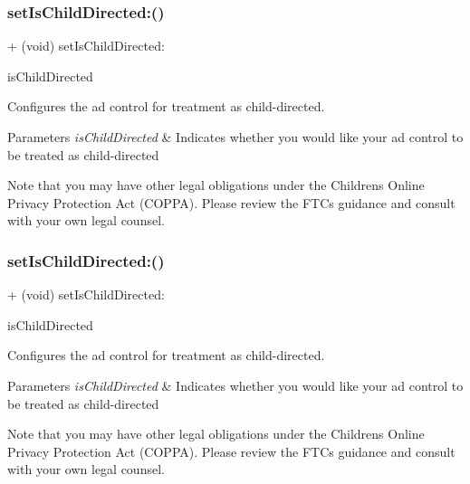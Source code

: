\subsubsection{\texorpdfstring{set\+Is\+Child\+Directed\+:()}{setIsChildDirected:()}\hspace{0.1cm}{\footnotesize\ttfamily [4/5]}}
{\footnotesize\ttfamily + (void) set\+Is\+Child\+Directed\+: \begin{DoxyParamCaption}\item[{(B\+O\+OL)}]{is\+Child\+Directed }\end{DoxyParamCaption}}

Configures the ad control for treatment as child-\/directed.


\begin{DoxyParams}{Parameters}
{\em is\+Child\+Directed} & Indicates whether you would like your ad control to be treated as child-\/directed\\
\hline
\end{DoxyParams}
Note that you may have other legal obligations under the Children\textquotesingle{}s Online Privacy Protection Act (C\+O\+P\+PA). Please review the F\+TC\textquotesingle{}s guidance and consult with your own legal counsel. \mbox{\label{interfaceFBAdSettings_a0f1e7129f1c07b5420d9a6a1f7eb9768}} 
\subsubsection{\texorpdfstring{set\+Is\+Child\+Directed\+:()}{setIsChildDirected:()}\hspace{0.1cm}{\footnotesize\ttfamily [5/5]}}
{\footnotesize\ttfamily + (void) set\+Is\+Child\+Directed\+: \begin{DoxyParamCaption}\item[{(B\+O\+OL)}]{is\+Child\+Directed }\end{DoxyParamCaption}}

Configures the ad control for treatment as child-\/directed.


\begin{DoxyParams}{Parameters}
{\em is\+Child\+Directed} & Indicates whether you would like your ad control to be treated as child-\/directed\\
\hline
\end{DoxyParams}
Note that you may have other legal obligations under the Children\textquotesingle{}s Online Privacy Protection Act (C\+O\+P\+PA). Please review the F\+TC\textquotesingle{}s guidance and consult with your own legal counsel. \mbox{\label{interfaceFBAdSettings_aab1304a0308648520b5dc1fda60a944c}} 
